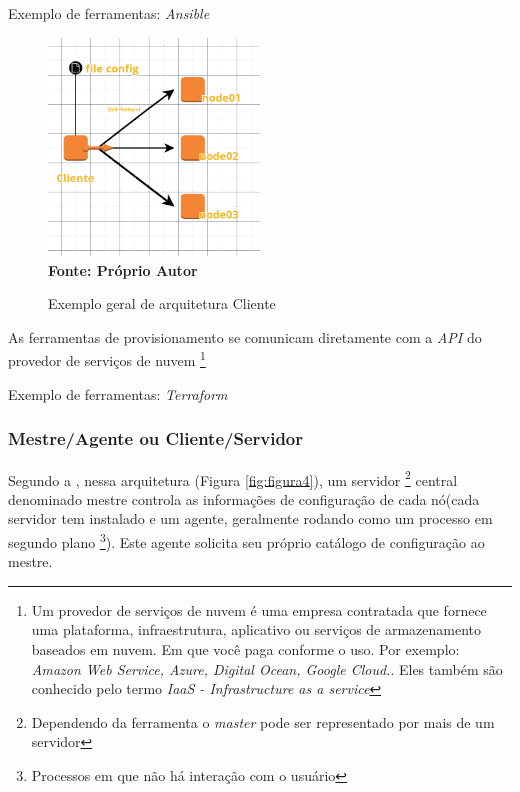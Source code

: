 Exemplo de ferramentas: \textit{Ansible}

\begin{figure}[ht]
	\centering	
	\caption[\hspace{0.1cm}Exemplo arquitetura Cliente]{Exemplo geral de arquitetura Cliente}
	\vspace{-0.4cm}
	\includegraphics[width=0.5\textwidth]{figuras/cliente.png}
	 \vspace{-0.2cm}
	\\\textbf{\footnotesize Fonte: Próprio Autor}
	\label{fig:figura3}
\end{figure}
\vspace{-0.5cm}


As ferramentas de provisionamento se comunicam diretamente com a \textit{API} do provedor de serviços de nuvem \footnote{Um provedor de serviços de nuvem é uma empresa contratada que fornece uma plataforma, infraestrutura, aplicativo ou serviços de armazenamento baseados em nuvem. Em que você paga conforme o uso. Por exemplo: \textit{Amazon Web Service, Azure, Digital Ocean, Google Cloud.}. Eles também são conhecido pelo termo \textit{IaaS - Infrastructure as a service} }

Exemplo de ferramentas: \textit{Terraform}

\subsubsection{Mestre/Agente ou Cliente/Servidor} \label{cliente-servidor}
 
 Segundo a , nessa arquitetura (Figura \ref{fig:figura4}), um servidor \footnote{Dependendo da ferramenta o \textit{master} pode ser representado por mais de um servidor} central denominado mestre controla as informações de configuração de cada nó(cada servidor tem instalado e um agente, geralmente rodando como um processo em segundo plano \footnote{Processos em que não há interação com o usuário}). Este agente solicita seu próprio catálogo de configuração ao mestre.  
 
